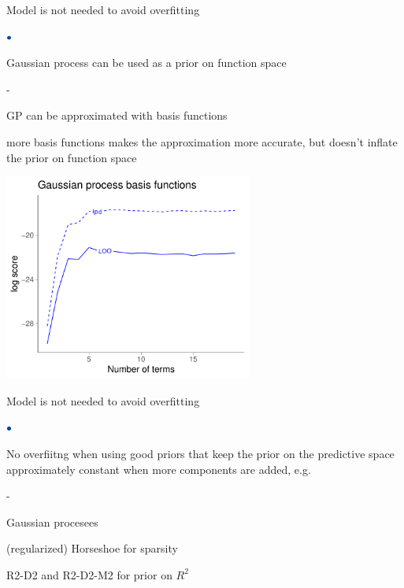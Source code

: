 \documentclass[english,t]{beamer}
\newenvironment{list1}{
   \begin{list}{$\color{list1}\bullet$}{\itemsep=6pt}}{
  \end{list}}
\newenvironment{list2}{
  \begin{list}{-}{\baselineskip=12pt\itemsep=2pt}}{
  \end{list}}
\begin{document}
\begin{frame}{Model is not needed to avoid overfitting}

\begin{list1}
\item Gaussian process can be used as a prior on function space
  \begin{list2}
  \item GP can be approximated with basis functions
  \item more basis functions makes the approximation more
    accurate, but doesn't inflate the prior on function space
  \end{list2}
\end{list1}
\vspace{-0.5\baselineskip}
{\includegraphics[height=6.8cm]{overfit_elpd_GP.pdf}}

\end{frame}

\begin{frame}{Model is not needed to avoid overfitting}

\begin{list1}
\item No overfiitng when using good priors that keep the prior on the
  predictive space approximately constant when more components are
  added, e.g.
  \begin{list2}
    \item Gaussian procesees
    \item (regularized) Horseshoe for sparsity
    \item R2-D2 and R2-D2-M2 for prior on $R^2$
  \end{list2}
\end{list1}

\end{frame}
\end{document}
